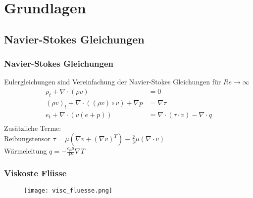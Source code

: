\documentclass[
	11pt, %
	aspectratio=169, %
]{beamer}
\begin{document}
\section{Grundlagen} %

\subsection{Navier-Stokes Gleichungen}


\begin{frame}
	\frametitle{Navier-Stokes Gleichungen}
	Eulergleichungen sind Vereinfachung der Navier-Stokes Gleichungen für $Re \rightarrow \infty$\\
	\begin{equation}
	\begin{split}
		\rho_t + \nabla\cdot (\rho v) &= 0\\
		(\rho v)_t + \nabla\cdot ((\rho v)\circ v) + \nabla p &=\nabla \tau\\
		e_t + \nabla \cdot (v(e+p)) &=\nabla \cdot (\tau \cdot v) - \nabla \cdot q \\
	\end{split}
\end{equation}
	Zusätzliche Terme:\\
	Reibungstensor $\tau = \mu (\nabla v + (\nabla v)^T) - \frac{2}{3}\mu (\nabla \cdot v)$\\
	Wärmeleitung $q = -\frac{c_p\mu}{Pr}\nabla T$\\

\end{frame}

\begin{frame}
	\frametitle{Viskoste Flüsse}
	\begin{center}
		\begin{figure}
			\texttt{[image: visc\_fluesse.png]}
		\end{figure}
	\end{center}
\end{frame}
\end{document}
